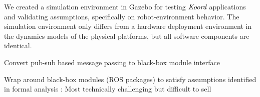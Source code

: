 \begin{noinditem}
\item We created a simulation environment in Gazebo for testing $\emph{Koord}$ applications and validating assumptions, specifically on robot-environment behavior. The simulation environment only differs from a hardware deployment environment in the dynamics models of the physical platforms, but all software components are identical.

\item Convert pub-sub based message passing to black-box module interface
\item Wrap around black-box modules (ROS packages) to satisfy assumptions identified in formal analysis : Most technically challenging but difficult to sell


\end{noinditem}
%
%
%
%
%
%
%


